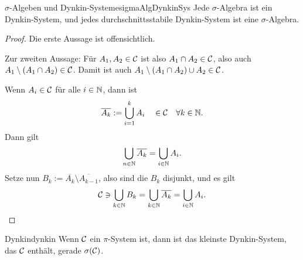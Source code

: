 \documentclass[language=ngerman]{../../Template/TemplateLecture}
\begin{document}
\begin{lem}{$\sigma$-Algeben und Dynkin-Systeme}{sigmaAlgDynkinSys}
    Jede $\sigma$-Algebra ist ein Dynkin-System, und jedes durchschnittsstabile Dynkin-System ist eine $\sigma$-Algebra.
\end{lem}
\begin{proof}
    Die erste Aussage ist offensichtlich. 

    Zur zweiten Aussage: Für $A_1, A_2 \in \mathcal{C}$ ist also $A_1 \cap A_2 \in \mathcal{C}$, also auch $A_1 \setminus (A_1 \cap A_2) \in \mathcal{C}$. Damit ist auch $A_1 \setminus (A_1 \cap A_2) \cup A_2 \in \mathcal{C}$.

    Wenn $A_i \in \mathcal{C}$ für alle $i \in \mathbb{N}$, dann ist 
    \begin{equation}
        \overline{A_k} := \bigcup_{i = 1}^k A_i \quad \in \mathcal{C} \quad \forall k \in \mathbb{N}.
    \end{equation}
    Dann gilt 
    \begin{equation}
        \bigcup_{n \in \mathbb{N}} \overline{A_k} = \bigcup_{i \in \mathbb{N}} A_i.
    \end{equation}
    Setze nun $B_k := \overline{A_k} \setminus \overline{A_{k-1}}$, also sind die $B_k$ disjunkt, und es gilt 
    \begin{equation}
        \mathcal{C} \ni \bigcup_{k \in \mathbb{N}} B_k  = \bigcup_{k \in \mathbb{N}} \overline{A_k} = \bigcup_{i \in \mathbb{N}} A_i.
    \end{equation}
\end{proof}

\begin{thm}{Dynkin}{dynkin}
    Wenn $\mathcal{C}$ ein $\pi$-System ist, dann ist das kleinste Dynkin-System, das $\mathcal{C}$ enthält, gerade $\sigma(\mathcal{C})$.
\end{thm}
\end{document}
